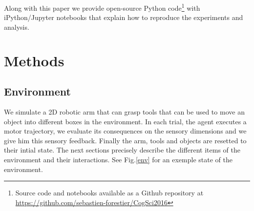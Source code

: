 \documentclass[10pt,letterpaper]{article}
\begin{document}
	Along with this paper we provide open-source Python code\footnote{Source code and notebooks available as a Github repository at \url{https://github.com/sebastien-forestier/CogSci2016}} 
	with iPython/Jupyter notebooks that explain how to reproduce the experiments and analysis. 
	
%

\section{Methods}

	\subsection{Environment}
	
		We simulate a 2D robotic arm that can grasp tools that can be used to move an object into different boxes in the environment. 		
		In each trial, the agent executes a motor trajectory, we evaluate its consequences on the sensory dimensions and we give him
		this sensory feedback. Finally the arm, tools and objects are resetted to their intial state.
		The next sections precisely describe the different items of the environment and their interactions.	
		See Fig.\ref{env} for an exemple state of the environment. 
		
\end{document}
